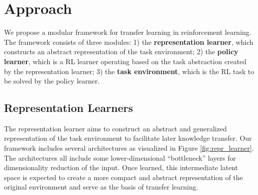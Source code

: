 \section{Approach}
\label{sec:approach}
We propose a modular framework for transfer learning in reinforcement learning. 
The framework consists of three modules: 
1) the \textbf{representation learner}, which constructs an abstract representation of the task environment;
2) the \textbf{policy learner}, which is a RL learner operating based on the task abstraction created by the representation learner;
3) the \textbf{task environment}, which is the RL task to be solved by the policy learner.

\subsection{Representation Learners}
The representation learner aims to construct an abstract and generalized representation of the task environment to facilitate later knowledge transfer.
Our framework includes several architectures as visualized in Figure \ref{fig:repr_learner}.
The architectures all include some lower-dimensional ``bottleneck'' layers for dimensionality reduction of the input.
Once learned, this intermediate latent space is expected to create a more compact and abstract representation of the original environment and serve as the basis of transfer learning. 

